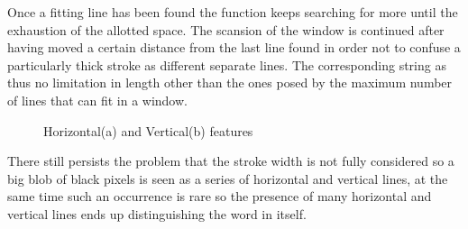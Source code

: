 Once a fitting line has been found the function keeps searching for more until the exhaustion of the allotted space. The scansion of the window is continued after having moved a certain distance from the last line found in order not to confuse a particularly thick stroke as different separate lines.
The corresponding string as thus no limitation in length other than the ones posed by the maximum number of lines that can fit in a window.

\begin{figure}[!htpb]
 \centering
 \hspace{15mm}
 \caption{Horizontal(a) and Vertical(b) features}
  \end{figure}
\vspace{2mm}

There still persists the problem that the stroke width is not fully considered so a big blob of black pixels is seen as a series of horizontal and vertical lines, at the same time such an occurrence is rare so the presence of many horizontal and vertical lines ends up distinguishing the word in itself.    

